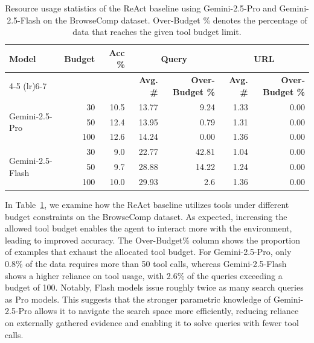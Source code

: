\begin{table}[h]
\centering
\caption{Resource usage statistics of the ReAct baseline using Gemini-2.5-Pro and Gemini-2.5-Flash on the BrowseComp dataset. Over-Budget \% denotes the percentage of data that reaches the given tool budget limit.}
\label{tab:react_budget_usage}
\small
\begin{tabular}{lrrrrrr}
\toprule
\multirow{2}{*}{\textbf{Model}} &
\multirow{2}{*}{\textbf{Budget}} &
\multirow{2}{*}{\textbf{Acc \%}} &
\multicolumn{2}{c}{\textbf{Query}} &
\multicolumn{2}{c}{\textbf{URL}} \\
\cmidrule(lr){4-5} \cmidrule(lr){6-7}
& & & \textbf{Avg. \#} & \textbf{Over-Budget \%} 
  & \textbf{Avg. \#} & \textbf{Over-Budget \%} \\
\midrule

\multirow{3}{*}{Gemini-2.5-Pro}
& 30  & 10.5 & 13.77 & 9.24   & 1.33 & 0.00 \\
& 50  & 12.4 & 13.95 & 0.79   & 1.31 & 0.00 \\
& 100 & 12.6 & 14.24 & 0.00   & 1.36 & 0.00 \\

\midrule

\multirow{3}{*}{Gemini-2.5-Flash}
& 30  & 9.0  & 22.77  & 42.81  & 1.04 & 0.00 \\
& 50  & 9.7 & 28.88 & 14.22  & 1.24 & 0.00 \\
& 100 & 10.0 & 29.93 & 2.6   & 1.36 & 0.00 \\

\bottomrule
\end{tabular}
\end{table}

In Table~\ref{tab:react_budget_usage}, we examine how the ReAct baseline utilizes tools under different budget constraints on the BrowseComp dataset. As expected, increasing the allowed tool budget enables the agent to interact more with the environment, leading to improved accuracy. The Over-Budget\% column shows the proportion of examples that exhaust the allocated tool budget. For Gemini-2.5-Pro, only 0.8\% of the data requires more than 50 tool calls, whereas Gemini-2.5-Flash shows a higher reliance on tool usage, with 2.6\% of the queries exceeding a budget of 100. Notably, Flash models issue roughly twice as many search queries as Pro models. This suggests that the stronger parametric knowledge of Gemini-2.5-Pro allows it to navigate the search space more efficiently, reducing reliance on externally gathered evidence and enabling it to solve queries with fewer tool calls.

